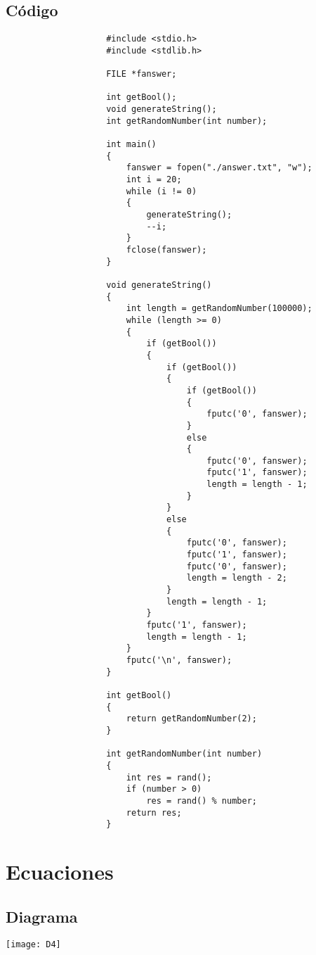 \documentclass[11pt,a4paper]{report}
\begin{document}
		\section{Código}
			\begin{lstlisting}
					#include <stdio.h>
					#include <stdlib.h>
					
					FILE *fanswer;
					
					int getBool();
					void generateString();
					int getRandomNumber(int number);
					
					int main()
					{
					    fanswer = fopen("./answer.txt", "w");
					    int i = 20;
					    while (i != 0)
					    {
					        generateString();
					        --i;
					    }
					    fclose(fanswer);
					}
					
					void generateString()
					{
					    int length = getRandomNumber(100000);
					    while (length >= 0)
					    {
					        if (getBool())
					        {
					            if (getBool())
					            {
					                if (getBool())
					                {
					                    fputc('0', fanswer);
					                }
					                else
					                {
					                    fputc('0', fanswer);
					                    fputc('1', fanswer);
					                    length = length - 1;
					                }
					            }
					            else
					            {
					                fputc('0', fanswer);
					                fputc('1', fanswer);
					                fputc('0', fanswer);
					                length = length - 2;
					            }
					            length = length - 1;
					        }
					        fputc('1', fanswer);
					        length = length - 1;
					    }
					    fputc('\n', fanswer);
					}
					
					int getBool()
					{
					    return getRandomNumber(2);
					}
					
					int getRandomNumber(int number)
					{
					    int res = rand();
					    if (number > 0)
					        res = rand() % number;
					    return res;
					}
	            \end{lstlisting}

\chapter{Ecuaciones}
	 
		
		\section{Diagrama}
		\texttt{[image: D4]}
\end{document}
